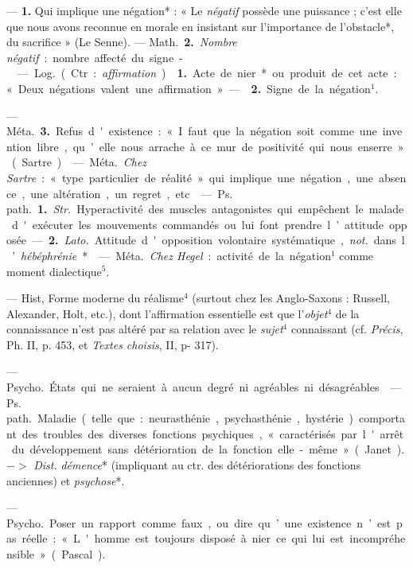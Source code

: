 \begin{itemize}[leftmargin=1cm, label=, itemsep=1pt]
 — {\bf 1.} Qui implique une négation* : « Le {\it négatif}
possède une puissance ; c’est elle que nous avons reconnue en morale en
insistant sur l'importance de l’obstacle*, du sacrifice » (Le Senne). —
\si{Math.} {\bf 2.} {\it Nombre négatif} : nombre affecté du signe -.

 — \si{Log.} (Ctr. : {\it affirmation}). 
{\bf 1.} Acte de nier* ou produit de cet acte : « Deux négations valent une
affirmation » —  {\bf 2.} Signe de la négation$^1$.

— \si{Méta.} {\bf 3.} Refus d'existence : « I faut que la négation soit comme
une invention libre, qu’elle nous arrache à ce mur de positivité qui nous
enserre » (Sartre).

 — \si{Méta.} {\it Chez Sartre} : « type particulier de réalité
» qui implique une négation, une absence, une altération, un regret, etc.

 — \si{Ps. path.} {\bf 1.} {\it Str.} Hyperactivité des
muscles antagonistes qui empêchent le malade d'exécuter les mouvements
commandés ou lui font prendre l’attitude opposée. — {\bf 2.} {\it Lato.}
Attitude d'opposition volontaire systématique, {\it not.} dans
l’{\it hébéphrénie}*.

 — \si{Méta.} {\it Chez Hegel} : activité de la négation$^1$
comme moment dialectique$^5$.

 — Hist,  Forme moderne du réalisme$^4$
(surtout chez les Anglo-Saxons : Russell, Alexander, Holt, etc.), dont
l'affirmation essentielle est que l'{\it objet}$^4$ de la connaissance n’est
pas altéré par sa relation avec le {\it sujet}$^4$ connaissant (cf.
{\it Précis}, Ph. II, p. 453, et {\it Textes choisis}, II, p- 317).

 — \si{Psycho.} États qui
ne seraient à aucun degré ni agréables ni désagréables.

 — \si{Ps. path.} Maladie (telle que : neurasthénie,
psychasthénie, hystérie) comportant des troubles des diverses fonctions
psychiques, « caractérisés par l'arrêt du développement sans détérioration de
la fonction elle-même » (Janet). $->$ {\it Dist.} {\it démence}* (impliquant
au ctr. des détériorations des fonctions anciennes) et {\it psychose}*.

 — \si{Psycho.} Poser un rapport comme faux, ou dire qu’une
existence n’est pas réelle : « L'homme est toujours disposé à nier ce qui lui
est incompréhensible » (Pascal).


\end{itemize}
